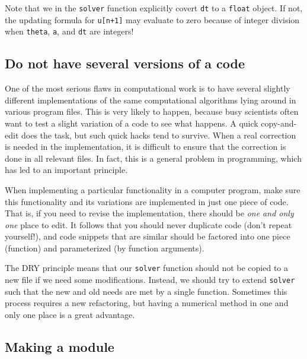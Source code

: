 \documentclass[graybox,sectrefs,envcountresetchap,open=right,final]{svmonodo}
\newenvironment{notice_mdfboxadmon}[1][]{
\begin{notice_mdfboxmdframed}[frametitle=#1]
}
{
\end{notice_mdfboxmdframed}
}
\begin{document}
\begin{notice_mdfboxadmon}
Note that we in the \texttt{solver} function explicitly covert \texttt{dt} to a
\texttt{float} object. If not, the updating formula for \texttt{u[n+1]} may evaluate
to zero because of integer division when \texttt{theta}, \texttt{a}, and \texttt{dt} are integers!
\end{notice_mdfboxadmon}



\subsection{Do not have several versions of a code}

One of the most serious flaws in computational work is to have several
slightly different implementations of the same computational algorithms
lying around in various program files. This is very likely to happen,
because busy scientists often want to test a slight variation of a code to see
what happens. A quick copy-and-edit does the task, but such quick hacks tend
to survive. When a real correction is needed in the implementation,
it is difficult to ensure that the correction is done in all relevant files.
In fact, this is a general problem in programming, which has led to
an important principle.


\begin{notice_mdfboxadmon}
When implementing a particular functionality in a computer program, make sure
this functionality and its variations are implemented in just one piece
of code. That is, if you need to revise the implementation, there should be
\emph{one and only one} place to edit. It follows that you should never
duplicate code (don't repeat yourself!), and code snippets that are
similar should be factored into one piece (function) and parameterized (by
function arguments).
\end{notice_mdfboxadmon}



The DRY principle means that our \texttt{solver} function should not be
copied to a new file if we need some modifications. Instead, we
should try to extend \texttt{solver} such that the new and old needs are
met by a single function. Sometimes this process requires a new
refactoring, but having a numerical method in one and only one place
is a great advantage.

\subsection{Making a module}
\label{softeng1:basic:module}
\end{document}

